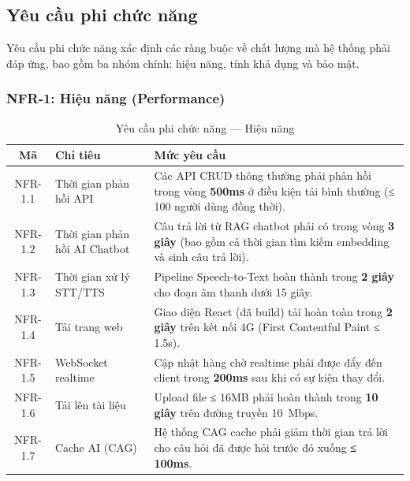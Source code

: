 \subsection{Yêu cầu phi chức năng}

Yêu cầu phi chức năng xác định các ràng buộc về chất lượng mà hệ thống
phải đáp ứng, bao gồm ba nhóm chính: hiệu năng, tính khả dụng và bảo mật.

\subsubsection{NFR-1: Hiệu năng (Performance)}

\begin{table}[H]
\centering
\caption{Yêu cầu phi chức năng — Hiệu năng}
\label{tab:nfr-perf}
\begin{tabularx}{\textwidth}{|c|l|X|}
\hline
\textbf{Mã} & \textbf{Chỉ tiêu} & \textbf{Mức yêu cầu} \\
\hline
NFR-1.1 & Thời gian phản hồi API &
  Các API CRUD thông thường phải phản hồi trong vòng \textbf{500ms}
  ở điều kiện tải bình thường (≤ 100 người dùng đồng thời). \\
\hline
NFR-1.2 & Thời gian phản hồi AI Chatbot &
  Câu trả lời từ RAG chatbot phải có trong vòng \textbf{3 giây}
  (bao gồm cả thời gian tìm kiếm embedding và sinh câu trả lời). \\
\hline
NFR-1.3 & Thời gian xử lý STT/TTS &
  Pipeline Speech-to-Text hoàn thành trong \textbf{2 giây} cho
  đoạn âm thanh dưới 15 giây. \\
\hline
NFR-1.4 & Tải trang web &
  Giao diện React (đã build) tải hoàn toàn trong \textbf{2 giây}
  trên kết nối 4G (First Contentful Paint ≤ 1.5s). \\
\hline
NFR-1.5 & WebSocket realtime &
  Cập nhật hàng chờ realtime phải được đẩy đến client trong
  \textbf{200ms} sau khi có sự kiện thay đổi. \\
\hline
NFR-1.6 & Tải lên tài liệu &
  Upload file ≤ 16MB phải hoàn thành trong \textbf{10 giây}
  trên đường truyền 10~Mbps. \\
\hline
NFR-1.7 & Cache AI (CAG) &
  Hệ thống CAG cache phải giảm thời gian trả lời cho câu hỏi
  đã được hỏi trước đó xuống \textbf{≤ 100ms}. \\
\hline
\end{tabularx}
\end{table}

